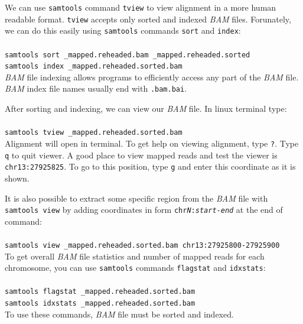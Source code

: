


We can use \texttt{samtools} command \texttt{tview} to view alignment in a
more human readable format. \texttt{tview} accepts only 
sorted and indexed \textit{BAM} files. Forunately, we can
do this easily using \texttt{samtools} commands 
\texttt{sort} and \texttt{index}:\\~\\
\texttt{samtools sort \mapReads\_mapped.reheaded.bam \mapReads\_mapped.reheaded.sorted}\\
\texttt{samtools index \mapReads\_mapped.reheaded.sorted.bam}\\

\textit{BAM} file indexing allows programs to efficiently access any part of the \textit{BAM} file.
\textit{BAM} index file names usually end with \texttt{.bam.bai}. 

After sorting and indexing, we can view our \textit{BAM} file. In linux terminal type:\\~\\
\texttt{samtools tview \mapReads\_mapped.reheaded.sorted.bam }\\

Alignment will open in terminal. To get help on viewing alignment, type \texttt{?}.
Type \texttt{q} to quit viewer. A good place to view mapped reads and
test the viewer is \texttt{chr13:27925825}. To go to this position, type \texttt{g}
and enter this coordinate as it is shown.

It is also possible to extract some specific region from the \textit{BAM} file with \texttt{samtools view}
by adding coordinates in form \texttt{chr\textit{N}:\textit{start}-\textit{end}} at the end of command:\\~\\
\texttt{samtools view \mapReads\_mapped.reheaded.sorted.bam chr13:27925800-27925900}\\

To get overall \textit{BAM} file statistics and number of mapped reads for each chromosome, you can use 
\texttt{samtools} commands \texttt{flagstat} and \texttt{idxstats}:\\~\\
\texttt{samtools flagstat \mapReads\_mapped.reheaded.sorted.bam}\\
\texttt{samtools idxstats \mapReads\_mapped.reheaded.sorted.bam}\\

To use these commands, \textit{BAM} file must be sorted and indexed.
